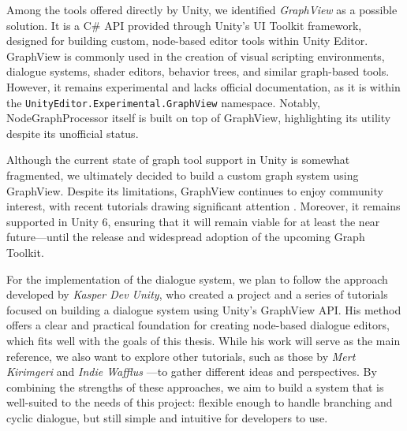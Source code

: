 Among the tools offered directly by Unity, we identified \textit{GraphView} \cite{Unity-GraphView} as a possible solution. It is a C\# API provided through Unity’s UI Toolkit framework, designed for building custom, node-based editor tools within Unity Editor. GraphView is commonly used in the creation of visual scripting environments, dialogue systems, shader editors, behavior trees, and similar graph-based tools. However, it remains experimental and lacks official documentation, as it is within the \verb|UnityEditor.Experimental.GraphView| namespace. Notably, NodeGraphProcessor itself is built on top of GraphView, highlighting its utility despite its unofficial status.

Although the current state of graph tool support in Unity is somewhat fragmented, we ultimately decided to build a custom graph system using GraphView. Despite its limitations, GraphView continues to enjoy community interest, with recent tutorials drawing significant attention \cite{NodeEditor-YT}. Moreover, it remains supported in Unity 6, ensuring that it will remain viable for at least the near future—until the release and widespread adoption of the upcoming Graph Toolkit.

For the implementation of the dialogue system, we plan to follow the approach developed by \textit{Kasper Dev Unity}, who created a project \cite{Kasper-Dialogue-Tutorial-git} and a series of tutorials \cite{Kasper-Dialogue-Tutorial-YT} focused on building a dialogue system using Unity’s GraphView API. His method offers a clear and practical foundation for creating node-based dialogue editors, which fits well with the goals of this thesis. While his work will serve as the main reference, we also want to explore other tutorials, such as those by \textit{Mert Kirimgeri} \cite{merpheus-Dialogue-Tutorial-git}\cite{merpheus-Dialogue-Tutorial-YT} and \textit{Indie Wafflus} \cite{Wafflus-Dialogue-Tutorial-git}\cite{Wafflus-Dialogue-Tutorial-YT}—to gather different ideas and perspectives. By combining the strengths of these approaches, we aim to build a system that is well-suited to the needs of this project: flexible enough to handle branching and cyclic dialogue, but still simple and intuitive for developers to use. 
